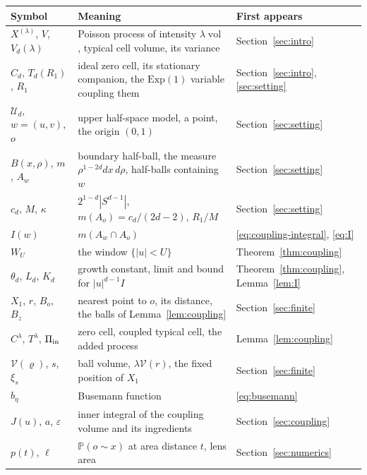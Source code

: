 \documentclass[11pt]{amsart}
\theoremstyle{remark}
\newcommand{\Prob}{\mathbb{P}}
\newcommand{\vol}{\operatorname{vol}}
\begin{document}
\begin{center}
\begin{tabular}{p{3.2cm}p{8.0cm}p{3.0cm}}
\toprule
Symbol & Meaning & First appears\\
\midrule
$X^{(\lambda)}$, $V$, $V_d(\lambda)$ & Poisson process of intensity $\lambda\vol$, typical cell volume, its variance & Section~\ref{sec:intro}\\
$C_d$, $T_d(R_1)$, $R_1$ & ideal zero cell, its stationary companion, the $\mathrm{Exp}(1)$ variable coupling them & Section~\ref{sec:intro}, \ref{sec:setting}\\
$\mathcal U_d$, $w=(u,v)$, $o$ & upper half-space model, a point, the origin $(0,1)$ & Section~\ref{sec:setting}\\
$B(x,\rho)$, $m$, $A_w$ & boundary half-ball, the measure $\rho^{1-2d}dx\,d\rho$, half-balls containing $w$ & Section~\ref{sec:setting}\\
$c_d$, $M$, $\kappa$ & $2^{1-d}|S^{d-1}|$, $m(A_o)=c_d/(2d-2)$, $R_1/M$ & Section~\ref{sec:setting}\\
$I(w)$ & $m(A_w\cap A_o)$ & \eqref{eq:coupling-integral}, \eqref{eq:I}\\
$W_U$ & the window $\{|u|<U\}$ & Theorem~\ref{thm:coupling}\\
$\theta_d$, $L_d$, $K_d$ & growth constant, limit and bound for $|u|^{d-1}I$ & Theorem~\ref{thm:coupling}, Lemma~\ref{lem:I}\\
$X_1$, $r$, $B_o$, $B_z$ & nearest point to $o$, its distance, the balls of Lemma~\ref{lem:coupling} & Section~\ref{sec:finite}\\
$C^\lambda$, $T^\lambda$, $\Pi_{\rm in}$ & zero cell, coupled typical cell, the added process & Lemma~\ref{lem:coupling}\\
$\mathcal V(\varrho)$, $s$, $\xi_s$ & ball volume, $\lambda\mathcal V(r)$, the fixed position of $X_1$ & Section~\ref{sec:finite}\\
$b_\eta$ & Busemann function & \eqref{eq:busemann}\\
$J(u)$, $a$, $\varepsilon$ & inner integral of the coupling volume and its ingredients & Section~\ref{sec:coupling}\\
$p(t)$, $\ell$ & $\Prob(o\sim x)$ at area distance $t$, lens area & Section~\ref{sec:numerics}\\
\bottomrule
\end{tabular}
\end{center}
\end{document}
